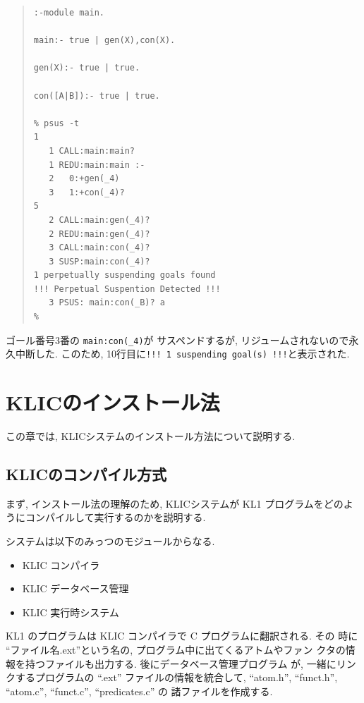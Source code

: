 \documentclass[a4,titlepage]{jsreport}
\begin{document}
\begin{quote}%
\begin{Verbatim}[frame=single,baselinestretch=0.8]
:-module main.

main:- true | gen(X),con(X).

gen(X):- true | true.

con([A|B]):- true | true.

% psus -t                                                           1
   1 CALL:main:main? 
   1 REDU:main:main :-
   2   0:+gen(_4)
   3   1:+con(_4)?                                                  5
   2 CALL:main:gen(_4)? 
   2 REDU:main:gen(_4)? 
   3 CALL:main:con(_4)? 
   3 SUSP:main:con(_4)? 
1 perpetually suspending goals found
!!! Perpetual Suspention Detected !!!
   3 PSUS: main:con(_B)? a
%
\end{Verbatim}
\end{quote}%

ゴール番号3番の {\tt main:con(\_4)}が
サスペンドするが, リジュームされないので永久中断した.  
このため, 10行目に{\tt !!! 1 suspending goal(s) !!!}と表示された.  

\chapter{KLICのインストール法}

この章では, KLICシステムのインストール方法について説明する.  

\section{KLICのコンパイル方式}

まず, インストール法の理解のため, KLICシステムが
KL1 プログラムをどのようにコンパイルして実行するのかを説明する.  

システムは以下のみっつのモジュールからなる.  

\begin{itemize}
\item KLIC コンパイラ

\item KLIC データベース管理

\item KLIC 実行時システム
\end{itemize}

KL1 のプログラムは KLIC コンパイラで C プログラムに翻訳される.  その
時に ``ファイル名.ext''という名の, プログラム中に出てくるアトムやファン
クタの情報を持つファイルも出力する.  後にデータベース管理プログラム
が, 一緒にリンクするプログラムの ``.ext'' ファイルの情報を統合して,
``atom.h'', ``funct.h'', ``atom.c'', ``funct.c'', ``predicates.c'' の
諸ファイルを作成する.
\end{document}
